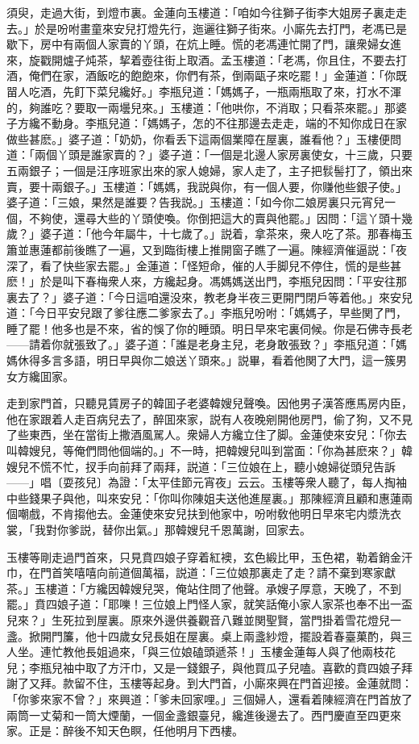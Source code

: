 須臾，走過大街，到燈市裏。金蓮向玉樓道：「咱如今往獅子街李大姐房子裏走走去。」於是吩咐畫童來安兒打燈先行，迤邐往獅子街來。小廝先去打門，老馮已是歇下，房中有兩個人家賣的丫頭，在炕上睡。慌的老馮連忙開了門，讓衆婦女進來，旋戳開爐子炖茶，挈着壺往街上取酒。孟玉樓道：「老馮，你且住，不要去打酒，俺們在家，酒飯吃的飽飽來，你們有茶，倒兩甌子來吃罷！」金蓮道：「你既㽞人吃酒，先飣下菜兒纔好。」李瓶兒道：「媽媽子，一瓶兩瓶取了來，打水不渾的，夠誰吃？要取一兩壜兒來。」玉樓道：「他哄你，不消取；只看茶來罷。」那婆子方纔不動身。李瓶兒道：「媽媽子，怎的不往那邊去走走，端的不知你成日在家做些甚麽。」婆子道：「奶奶，你看丢下這兩個業障在屋裏，誰看他？」玉樓便問道：「兩個丫頭是誰家賣的？」婆子道：「一個是北邊人家房裏使女，十三歲，只要五兩銀子；一個是汪序班家出來的家人媳婦，家人走了，主子把䯼髻打了，領出來賣，要十兩銀子。」玉樓道：「媽媽，我説與你，有一個人要，你赚他些銀子使。」婆子道：「三娘，果然是誰要？告我説。」玉樓道：「如今你二娘房裏只元宵兒一個，不夠使，還尋大些的丫頭使喚。你倒把這大的賣與他罷。」因問：「這丫頭十幾歲？」婆子道：「他今年屬牛，十七歲了。」説着，拿茶來，衆人吃了茶。那春梅玉簫並惠蓮都前後瞧了一遍，又到臨街樓上推開窗子瞧了一遍。陳經濟催逼説：「夜深了，看了快些家去罷。」金蓮道：「怪短命，催的人手脚兒不停住，慌的是些甚麽！」於是叫下春梅衆人來，方纔起身。馮媽媽送出門，李瓶兒因問：「平安往那裏去了？」婆子道：「今日這咱還没來，教老身半夜三更開門閉戶等着他。」來安兒道：「今日平安兒跟了爹往應二爹家去了。」李瓶兒吩咐：「媽媽子，早些関了門，睡了罷！他多也是不來，省的悞了你的睡頭。明日早來宅裏伺候。你是石佛寺長老——請着你就張致了。」婆子道：「誰是老身主兒，老身敢張致？」李瓶兒道：「媽媽休得多言多語，明日早與你二娘送丫頭來。」説畢，看着他関了大門，這一簇男女方纔囬家。

走到家門首，只聽見賃房子的韓囬子老婆韓嫂兒聲喚。因他男子漢答應馬房内臣，他在家跟着人走百病兒去了，醉囬來家，説有人夜晚剜開他房門，偷了狗，又不見了些東西，坐在當街上撒酒風駡人。衆婦人方纔立住了脚。金蓮使來安兒：「你去叫韓嫂兒，等俺們問他個端的。」不一時，把韓嫂兒叫到當面：「你為甚麽來？」韓嫂兒不慌不忙，扠手向前拜了兩拜，説道：「三位娘在上，聽小媳婦従頭兒告訴——」唱〔耍孩兒〕為證：「太平佳節元宵夜」云云。玉樓等衆人聽了，每人掏袖中些錢果子與他，叫來安兒：「你叫你陳姐夫送他進屋裏。」那陳經濟且顧和惠蓮兩個嘲戲，不肯搊他去。金蓮使來安兒扶到他家中，吩咐敎他明日早來宅内漿洗衣裳，「我對你爹説，替你出氣。」那韓嫂兒千恩萬謝，回家去。

玉樓等剛走過門首來，只見賁四娘子穿着紅襖，玄色緞比甲，玉色裙，勒着銷金汗巾，在門首笑嘻嘻向前道個萬福，説道：「三位娘那裏走了走？請不棄到寒家獻茶。」玉樓道：「方纔因韓嫂兒哭，俺站住問了他聲。承嫂子厚意，天晚了，不到罷。」賁四娘子道：「耶嚛！三位娘上門怪人家，就笑話俺小家人家茶也奉不出一盃兒來？」生死拉到屋裏。原來外邊供養觀音八難並関聖賢，當門掛着雪花燈兒一盞。掀開門簾，他十四歲女兒長姐在屋裏。桌上兩盞紗燈，擺設着春臺菓酌，與三人坐。連忙教他長姐過來，「與三位娘磕頭遞茶！」玉樓金蓮每人與了他兩枝花兒；李瓶兒袖中取了方汗巾，又是一錢銀子，與他買瓜子兒嗑。喜歡的賁四娘子拜謝了又拜。款留不住，玉樓等起身。到大門首，小廝來興在門首迎接。金蓮就問：「你爹來家不曾？」來興道：「爹未回家哩。」三個婦人，還看着陳經濟在門首放了兩筒一丈菊和一筒大煙蘭，一個金盞銀臺兒，纔進後邊去了。西門慶直至四更來家。正是：醉後不知天色瞑，任他明月下西樓。

